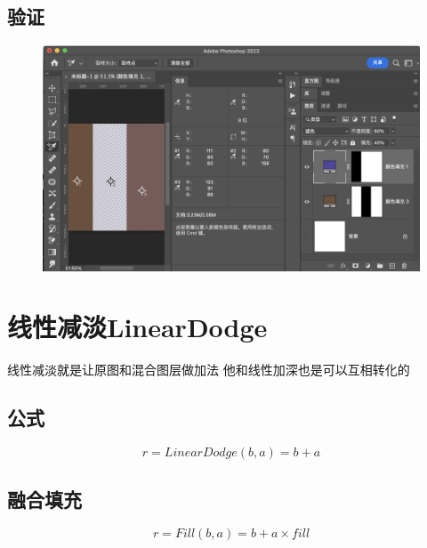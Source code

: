 \subsection{ 验证}
\begin{figure}[h!]
	\centering
	\includegraphics[width=\linewidth]{figure/screen}
	\caption{}
	\label{fig:screen}
\end{figure}

%
%
%

\newpage
\section{ 线性减淡LinearDodge}

线性减淡就是让原图和混合图层做加法
他和线性加深也是可以互相转化的

\subsection{ 公式}


\begin{equation}r=LinearDodge(b,a)=b+a\end{equation}

\subsection{ 融合填充}


\begin{equation}r= Fill(b,a) =b+a\times fill \end{equation}

